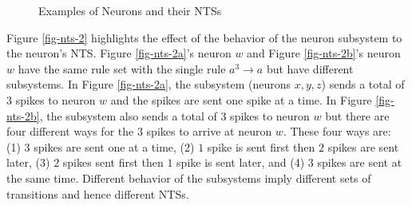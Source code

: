 \documentclass[]{elsarticle}
\theoremstyle{definition}
\theoremstyle{definition}
\newcommand{\ra}{\rightarrow}
\begin{document}
\begin{figure}[H]
\begin{subfigure}{.49\textwidth}
      \caption{}
      \label{fig-nts-1b}
   \end{subfigure}
   \caption{Examples of Neurons and their NTSs}
   \label{fig-nts-1}
\end{figure}


Figure \ref{fig-nts-2} highlights the effect of the behavior of the neuron subsystem to the neuron's
NTS. Figure \ref{fig-nts-2a}'s neuron $w$ and Figure \ref{fig-nts-2b}'s neuron $w$ have the same 
rule set with the single rule $a^3\ra a$ but have different subsystems. In Figure \ref{fig-nts-2a}, 
the subsystem (neurons $x,y,z$) sends a total of 3 spikes to neuron $w$ and the spikes are sent one 
spike at a time. In Figure \ref{fig-nts-2b}, the subsystem also sends a total of 3 spikes to neuron 
$w$ but there are four different ways for the $3$ spikes to arrive at neuron $w$. These four ways 
are: (1) $3$ spikes are sent one at a time, (2) $1$ spike is sent first then $2$ spikes are sent 
later, (3) $2$ spikes sent first then $1$ spike is sent later, and (4) $3$ spikes are sent at the 
same time. Different behavior of the subsystems imply different sets of transitions and hence 
different NTSs.

\end{document}
